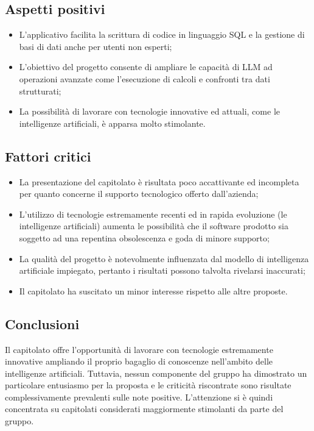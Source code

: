 \subsection{Aspetti positivi}
\begin{itemize}
    \setlength\itemsep{0em}
    \item L'applicativo facilita la scrittura di codice in linguaggio SQL e la gestione di basi di dati anche per utenti non esperti;
    \item L'obiettivo del progetto consente di ampliare le capacità di LLM ad operazioni avanzate come l'esecuzione di calcoli e confronti tra dati strutturati;
    \item La possibilità di lavorare con tecnologie innovative ed attuali, come le intelligenze artificiali, è apparsa molto stimolante.
\end{itemize}

\subsection{Fattori critici}
\begin{itemize}
    \setlength\itemsep{0em}
    \item La presentazione del capitolato è risultata poco accattivante ed incompleta per quanto concerne il supporto tecnologico offerto dall'azienda;
    \item L'utilizzo di tecnologie estremamente recenti ed in rapida evoluzione (le intelligenze artificiali) aumenta le possibilità che il software prodotto sia soggetto ad una repentina obsolescenza e goda di minore supporto;
    \item La qualità del progetto è notevolmente influenzata dal modello di intelligenza artificiale impiegato, pertanto i risultati possono talvolta rivelarsi inaccurati;
    \item Il capitolato ha suscitato un minor interesse rispetto alle altre proposte.
\end{itemize}

\subsection{Conclusioni}
Il capitolato offre l'opportunità di lavorare con tecnologie estremamente innovative ampliando il proprio bagaglio di conoscenze nell'ambito delle intelligenze artificiali. Tuttavia, nessun componente del gruppo ha dimostrato un particolare entusiasmo per la proposta e le criticità riscontrate sono risultate complessivamente prevalenti sulle note positive. L'attenzione si è quindi concentrata su capitolati considerati maggiormente stimolanti da parte del gruppo.